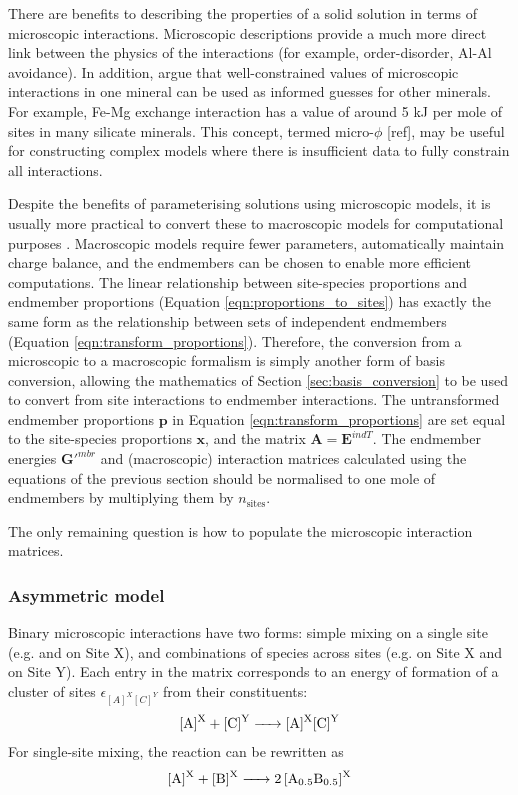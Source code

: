 \documentclass[preprint,12pt]{elsarticle}
\begin{document}
There are benefits to describing the properties of a solid solution in terms of microscopic interactions. Microscopic descriptions provide a much more direct link between the physics of the interactions (for example, order-disorder, Al-Al avoidance). In addition, \cite{Powell2014} argue that well-constrained values of microscopic interactions in one mineral can be used as informed guesses for other minerals. For example, Fe-Mg exchange interaction has a value of around 5 kJ per mole of sites in many silicate minerals. This concept, termed micro-$\phi$ [ref], may be useful for constructing complex models where there is insufficient data to fully constrain all interactions.

Despite the benefits of parameterising solutions using microscopic models, it is usually more practical to convert these to macroscopic models for computational purposes \citep{PH1993}. Macroscopic models require fewer parameters, automatically maintain charge balance, and the endmembers can be chosen to enable more efficient computations. The linear relationship between site-species proportions and endmember proportions (Equation \ref{eqn:proportions_to_sites}) has exactly the same form as the relationship between sets of independent endmembers (Equation \ref{eqn:transform_proportions}). Therefore, the conversion from a microscopic to a macroscopic formalism is simply another form of basis conversion, allowing the mathematics of Section \ref{sec:basis_conversion} to be used to convert from site interactions to endmember interactions. The untransformed endmember proportions $\boldsymbol{p}$ in Equation \ref{eqn:transform_proportions} are set equal to the site-species proportions $\boldsymbol{x}$, and the matrix $\boldsymbol{A} = \boldsymbol{E}^{\textit{ind}T}$. The endmember energies $\boldsymbol{G}'^{mbr}$ and (macroscopic) interaction matrices calculated using the equations of the previous section should be normalised to one mole of endmembers by multiplying them by $n_{\textrm{sites}}$.

The only remaining question is how to populate the microscopic interaction matrices. 

\subsubsection{Asymmetric model}
Binary microscopic interactions have two forms: simple mixing on a single site (e.g.  and  on Site X), and combinations of species across sites (e.g.  on Site X and  on Site Y). Each entry in the matrix corresponds to an energy of formation of a cluster of sites $\epsilon_{[A]^X[C]^Y}$ from their constituents:
\begin{equation}
    \ce{[A]^X + [C]^Y -> [A]^X[C]^Y}
\end{equation}
For single-site mixing, the reaction can be rewritten as 
\begin{equation}
    \ce{[A]^X + [B]^X -> 2[A_{0.5}B_{0.5}]^X}
\end{equation}
\end{document}
